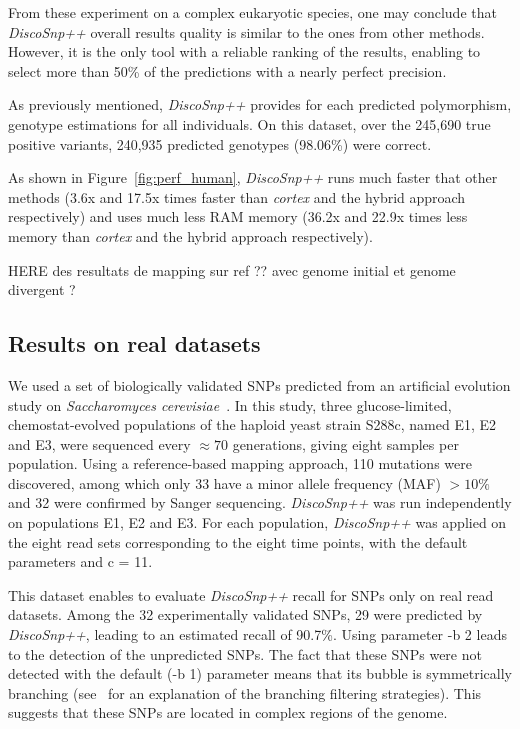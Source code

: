 \documentclass{bmcart}
\newcommand{\discopp}{{\it DiscoSnp++}\xspace}
\newcommand{\co}{{\it cortex}\xspace}
\begin{document}
From these experiment on a complex eukaryotic species, one may conclude that \discopp overall results quality is similar to the ones from other methods. However, it is the only tool with a reliable ranking of the results, enabling to select more than 50\% of the predictions with a nearly perfect precision.

As previously mentioned, \discopp provides for each predicted polymorphism, genotype estimations for all individuals. On this dataset, over the 245,690 true positive variants, 240,935 predicted genotypes (98.06\%) were correct. 

As shown in Figure~\ref{fig:perf_human}, \discopp runs much faster that other methods (3.6x and 17.5x times faster than \co and the hybrid approach respectively) and uses much less RAM memory (36.2x and 22.9x times less memory than \co and the hybrid approach respectively). 

HERE des resultats de mapping sur ref ?? avec genome initial et genome divergent ?



\subsection*{Results on real datasets}
We used a set of biologically validated SNPs predicted from an artificial evolution study on \emph{Saccharomyces cerevisiae}~\cite{Kvitek2013}. 
In this study, three glucose-limited, chemostat-evolved populations of the haploid yeast strain S288c, named
E1, E2 and E3, were sequenced every $\approx70$ generations, giving eight samples per population. Using a reference-based mapping approach, 110 mutations were discovered, among which only 33 have a minor allele frequency (MAF) $>10\%$ and 32 were confirmed by Sanger sequencing.  \discopp was run independently on populations E1, E2 and E3. For each population, \discopp was applied on the eight read sets corresponding to the eight time points, with the default parameters and c = 11. 

This dataset enables to evaluate \discopp recall for SNPs only on real read datasets. Among the 32 experimentally validated SNPs, 29 were predicted by \discopp, leading to an estimated recall of 90.7\%. Using parameter -b 2 leads to the detection of the unpredicted SNPs. The fact that these SNPs were not detected with the default (-b 1) parameter means that its bubble is symmetrically branching (see~\cite{Uricaru2014a} for an explanation of the branching filtering strategies). This suggests that these SNPs are located in complex regions of the genome. %
\end{document}
